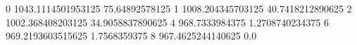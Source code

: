 0 1043.1114501953125 75.64892578125
1 1008.204345703125 40.7418212890625
2 1002.368408203125 34.9058837890625
4 968.7333984375 1.2708740234375
6 969.2193603515625 1.7568359375
8 967.4625244140625 0.0
